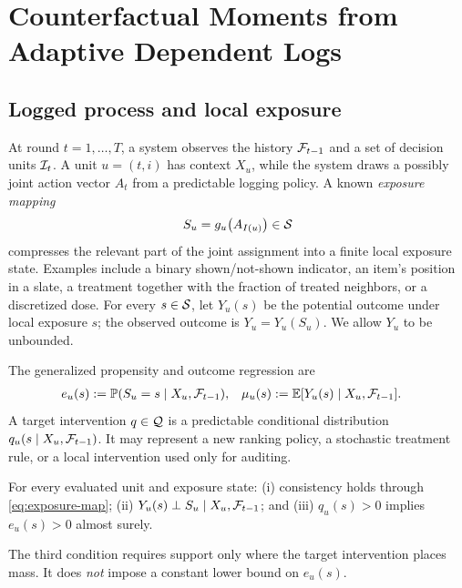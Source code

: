 \section{Counterfactual Moments from Adaptive Dependent Logs}
\label{sec:setup}

\subsection{Logged process and local exposure}
At round $t=1,\ldots,T$, a system observes the history $\mathcal{F}_{t-1}$ and a set of decision units $\mathcal{I}_t$. A unit $u=(t,i)$ has context $X_u$, while the system draws a possibly joint action vector $A_t$ from a predictable logging policy. A known \emph{exposure mapping}
\begin{equation}
    S_u = g_u\!\left(A_{I(u)}\right)\in\mathcal{S}
    \label{eq:exposure-map}
\end{equation}
compresses the relevant part of the joint assignment into a finite local exposure state. Examples include a binary shown/not-shown indicator, an item's position in a slate, a treatment together with the fraction of treated neighbors, or a discretized dose. For every $s\in\mathcal{S}$, let $Y_u(s)$ be the potential outcome under local exposure $s$; the observed outcome is $Y_u=Y_u(S_u)$. We allow $Y_u$ to be unbounded.

The generalized propensity and outcome regression are
\begin{align}
 e_u(s) &:= \mathbb{P}(S_u=s\mid X_u,\mathcal{F}_{t-1}), &
 \mu_u(s) &:= \mathbb{E}[Y_u(s)\mid X_u,\mathcal{F}_{t-1}].
 \label{eq:nuisance}
\end{align}
A target intervention $q\in\mathcal{Q}$ is a predictable conditional distribution $q_u(s\mid X_u,\mathcal{F}_{t-1})$. It may represent a new ranking policy, a stochastic treatment rule, or a local intervention used only for auditing.

\begin{assumption}
\label{ass:identification}
For every evaluated unit and exposure state: (i) consistency holds through \cref{eq:exposure-map}; (ii) $Y_u(s)\perp S_u\mid X_u,\mathcal{F}_{t-1}$; and (iii) $q_u(s)>0$ implies $e_u(s)>0$ almost surely.
\end{assumption}

The third condition requires support only where the target intervention places mass. It does \emph{not} impose a constant lower bound on $e_u(s)$.

